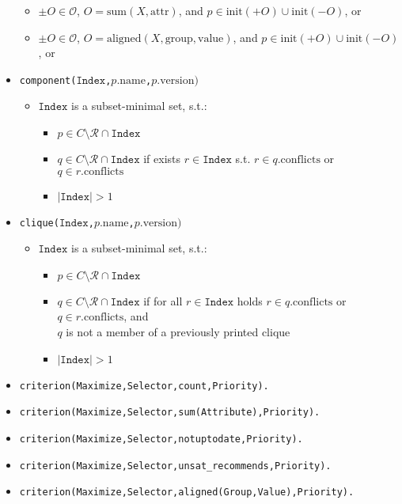 \documentclass[a4paper,english]{article}
\begin{document}
\begin{itemize}
    \begin{itemize}
      \item $\pm O\in\mathcal{O}$, $O=\mathrm{sum}(X,\mathrm{attr})$, and $p\in\mathrm{init}({+}O)\cup\mathrm{init}({-}O)$, or
      \item $\pm O\in\mathcal{O}$, $O=\mathrm{aligned}(X,\mathrm{group},\mathrm{value})$, and $p\in\mathrm{init}({+}O)\cup\mathrm{init}({-}O)$, or
    \end{itemize}
  \item \texttt{component($\mathtt{Index}$,$p.\mathrm{name}$,$p.\mathrm{version})$}
    \begin{itemize}
      \item $\mathtt{Index}$ is a subset-minimal set, s.t.:
      \begin{itemize}
        \item $p\in C\setminus\mathcal{R}\cap\mathtt{Index}$
        \item $q\in C\setminus\mathcal{R}\cap\mathtt{Index}$ if exists $r\in\mathtt{Index}$ s.t. $r\in q.\mathrm{conflicts}$ or $q\in r.\mathrm{conflicts}$
        \item $|\mathtt{Index}|>1$
      \end{itemize}
    \end{itemize}
  \item \texttt{clique($\mathtt{Index}$,$p.\mathrm{name}$,$p.\mathrm{version})$}
    \begin{itemize}
      \item $\mathtt{Index}$ is a subset-minimal set, s.t.:
      \begin{itemize}
        \item $p\in C\setminus\mathcal{R}\cap\mathtt{Index}$
        \item $q\in C\setminus\mathcal{R}\cap\mathtt{Index}$ if for all $r\in\mathtt{Index}$ holds $r\in q.\mathrm{conflicts}$ or $q\in r.\mathrm{conflicts}$, and\\$q$ is not a member of a previously printed clique
        \item $|\mathtt{Index}|>1$

      \end{itemize}
    \end{itemize}

  \item \texttt{criterion(Maximize,Selector,count,Priority).}
  \item \texttt{criterion(Maximize,Selector,sum(Attribute),Priority).}
  \item \texttt{criterion(Maximize,Selector,notuptodate,Priority).}
  \item \texttt{criterion(Maximize,Selector,unsat\_recommends,Priority).}
  \item \texttt{criterion(Maximize,Selector,aligned(Group,Value),Priority).}
\end{itemize}
\end{document}
